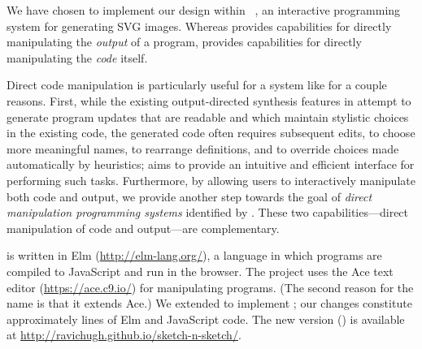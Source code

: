 
We have chosen to implement our design within \sns{}~\citep{sns-pldi,sns-uist},
an interactive programming system for generating SVG images.
%
Whereas \sns{} provides capabilities for
directly manipulating the \emph{output} of a program, \deuce{}
provides capabilities for directly manipulating the
\emph{code} itself.

Direct code manipulation is particularly useful for a system like \sns{} for a couple reasons.
First, while the existing output-directed synthesis features in \sns{}
attempt to generate program updates that
are readable and which maintain stylistic choices in the existing code,
the generated code often requires subsequent edits, \eg{} to
choose more meaningful names, to rearrange definitions, and to
override choices made automatically by heuristics; \deuce{} aims to provide
an intuitive and efficient interface for performing such tasks.
Furthermore, by allowing users to interactively manipulate both code
and output, we provide another step towards the goal of \emph{direct
manipulation programming systems} identified by \citet{sns-pldi}.
These two capabilities---direct manipulation of code and
output---are complementary.

\sns{} is written in Elm (\url{http://elm-lang.org/}),
a language in which programs are
compiled to JavaScript and run in the browser.
The project uses the Ace text editor (\url{https://ace.c9.io/})
for manipulating \little{} programs.
(The second reason for the name \deuce{}
is that it extends Ace.)
We extended \sns{} to implement \deuce{};
our changes constitute approximately \locImplementation{} lines of
Elm and JavaScript code.
The new version ()
is available at \url{http://ravichugh.github.io/sketch-n-sketch/}.

